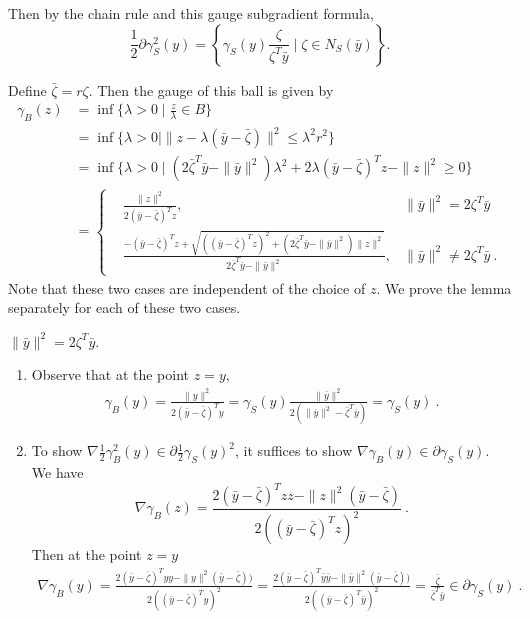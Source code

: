 \documentclass[sn-mathphys,Numbered]{sn-jnl}%
\newcommand{\bdry}{\mathrm{bdry\ }}
\begin{document}
\begin{appendices}
{Then by the chain rule and this gauge subgradient formula, 
$$ \frac{1}{2}\partial \gamma_S^2(y) = \left\{\gamma_S(y) \frac{\zeta}{\zeta^T \bar y} \mid \zeta\in N_S(\bar y)  \right\}.$$

Define $\bar \zeta = r\zeta$. Then the gauge of this ball is given by
    \begin{align*}
        \gamma _B(z)&=\inf \{\lambda>0 \mid \frac{z}{\lambda}  \in B\} \\
        &=\inf \{\lambda>0 \mid \|z-\lambda (\bar y-\bar \zeta)\|^2\leq \lambda ^2r^2\} \\
        &=\inf \{\lambda>0 \mid (2\bar \zeta^T \bar y -\|\bar y\|^2)\lambda ^2+2\lambda (\bar y -\bar \zeta)^Tz - \|z\|^2 \geq 0\} \\
        & = \left\{
    \begin{aligned}
    & \frac{\|z\|^2}{2(\bar y -\bar \zeta)^Tz}, & \|\bar y\|^2=2\zeta^T \bar y \\
    & \frac{-(\bar y -\bar \zeta)^Tz+\sqrt{((\bar y -\bar \zeta)^Tz)^2+(2\bar \zeta^T \bar y -\|\bar y\|^2)\|z\|^2}}{2\bar \zeta^T \bar y -\|\bar y\|^2}, & \|\bar y\|^2 \neq 2\zeta^T \bar y \ .
    \end{aligned}
    \right.
    \end{align*}
Note that these two cases are independent of the choice of $z$. We prove the lemma separately for each of these two cases.

 $\|\bar y\|^2 = 2\zeta^T \bar y$. 
\begin{enumerate}[label=(\alph*)]
     \item Observe that at the point $z=y$,
\begin{align*}
\gamma_B(y) = \frac{\|y\|^2}{2( \bar y -\bar \zeta)^Ty} 
=\gamma_S(y)\frac{\|\bar y\|^2}{2(\|\bar y\|^2-\bar \zeta^T\bar y)} 
=\gamma_S(y) \ .
\end{align*}

\item To show $\nabla \frac{1}{2}\gamma_B^2(y) \in \partial \frac{1}{2}\gamma_S(y)^2$, it suffices to show $\nabla \gamma_B(y) \in \partial \gamma_S(y)$. We have
$$\nabla \gamma_B(z) = \frac{2(\bar y - \bar \zeta)^Tz z-\|z\|^2(\bar y - \bar \zeta)}{2\left((\bar y- \bar \zeta)^Tz\right)^2} \ .
$$
Then at the point $z=y$
\begin{align*}
    \nabla \gamma_B(y) = \frac{2(\bar y - \bar \zeta)^T  y y-\|y\|^2(\bar y - \bar \zeta))}{2\left((\bar y- \bar \zeta)^T y\right)^2} 
    =\frac{2(\bar y - \bar \zeta)^T\bar y \bar y-\|\bar y\|^2(\bar y - \bar \zeta))}{2\left((\bar y- \bar \zeta)^T \bar y\right)^2}  
    =\frac{\bar \zeta}{\bar \zeta^T \bar y} \in \partial \gamma_S(y) \ .
\end{align*}



\end{enumerate}}
\end{appendices}
\end{document}
